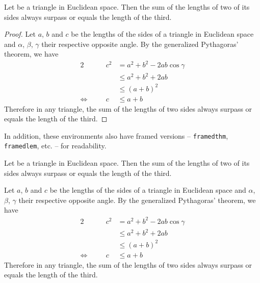 \documentclass[a4paper, 12pt]{report}
\begin{document}
    \begin{thm}
        Let be a triangle in Euclidean space. Then the sum of the lengths of two of its sides always surpass or equals the length of the third.
    \end{thm}

    \begin{proof}
        Let $a$, $b$ and $c$ be the lengths of the sides of a triangle in Euclidean space and $\alpha$, $\beta$, $\gamma$ their respective opposite angle. By the generalized Pythagoras' theorem, we have
        \begin{alignat*}{2}
                                  &  & c^2 & = a^2 + b^2 - 2ab \cos\gamma \\
                                  &  &     & \leq a^2 + b^2 + 2ab         \\
                                  &  &     & \leq (a + b)^2               \\
            \Leftrightarrow \quad &  & c   & \leq a + b
        \end{alignat*}
        Therefore in any triangle, the sum of the lengths of two sides always surpass or equals the length of the third.
    \end{proof}

    In addition, these environments also have framed versions -- \texttt{framedthm}, \texttt{framedlem}, etc. -- for readability.

    \begin{framedthm}\label{thm:Triangle inequality}
        Let be a triangle in Euclidean space. Then the sum of the lengths of two of its sides always surpass or equals the length of the third.
    \end{framedthm}

    \begin{framedprf}
        Let $a$, $b$ and $c$ be the lengths of the sides of a triangle in Euclidean space and $\alpha$, $\beta$, $\gamma$ their respective opposite angle. By the generalized Pythagoras' theorem, we have
        \begin{alignat*}{2}
                                  &  & c^2 & = a^2 + b^2 - 2ab \cos\gamma \\
                                  &  &     & \leq a^2 + b^2 + 2ab         \\
                                  &  &     & \leq (a + b)^2               \\
            \Leftrightarrow \quad &  & c   & \leq a + b
        \end{alignat*}
        Therefore in any triangle, the sum of the lengths of two sides always surpass or equals the length of the third. \qedadd
    \end{framedprf}
\end{document}
